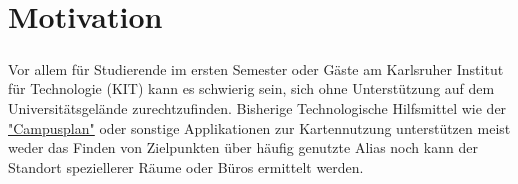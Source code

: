 \chapter{Motivation}

\paragraph{}
Vor allem für Studierende im ersten Semester oder Gäste am Karlsruher Institut für Technologie (KIT) 
kann es schwierig sein, sich ohne Unterstützung auf dem Universitätsgelände zurechtzufinden. Bisherige 
Technologische Hilfsmittel wie der \href{https://www.kit.edu/campusplan/}{"Campusplan"} oder sonstige Applikationen
zur Kartennutzung unterstützen meist weder das Finden von Zielpunkten über häufig genutzte Alias noch
kann der Standort speziellerer Räume oder Büros ermittelt werden.
